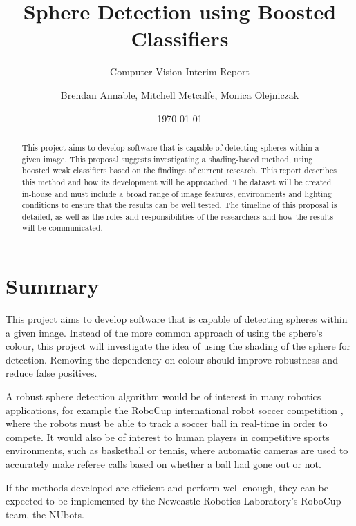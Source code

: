 \documentclass[11pt]{scrartcl}
\title{Sphere Detection using Boosted Classifiers}
\subtitle{Computer Vision Interim Report}
\author{Brendan Annable, Mitchell Metcalfe, Monica Olejniczak}
\date{\today}
\begin{document}
	\maketitle

	\begin{abstract}



		This project aims to develop software that is capable of detecting spheres within a given image. This proposal suggests investigating a shading-based method, using boosted weak classifiers based on the findings of current research. This report 
		describes this method and how its development will be approached. The
		dataset will be created in-house and must include a broad 
		range of image features, environments and lighting conditions to ensure
		that the results can be well tested. The timeline of this proposal is
		detailed, as well as the roles and responsibilities of the researchers
		and how the results will be communicated.
	\end{abstract}

	\newpage
	\tableofcontents
	\newpage

	\section{Summary} {
        

        This project aims to develop software that is capable of detecting spheres within a given image. Instead of the more common approach of using the sphere's colour, this project will investigate the idea of using the shading of the sphere for detection. Removing the dependency on colour should improve robustness and reduce false positives.
        
        A robust sphere detection algorithm would be of interest in many robotics applications, for example the RoboCup international robot soccer competition \citep{KitanoAKNO97}, where the robots must be able to track a soccer ball in real-time in order to compete. It would also be of interest to human players in competitive sports environments, such as basketball or tennis, where automatic cameras are used to accurately make referee calls based on whether a ball had gone out or not.
        
        If the methods developed are efficient and perform well enough, they can be expected to be implemented by the Newcastle Robotics Laboratory's RoboCup team, the NUbots.
		
	}
\end{document}
